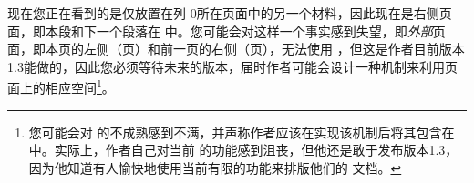 %
% 

现在您正在看到的是仅放置在列-0所在页面中的另一个材料，因此现在是右侧页面，即本段和下一个段落在 \postenv 中。您可能会对这样一个事实感到失望，即\emph{外部}页面，即本页的左侧（\pageref{page:ppts-paired2}页）和前一页的右侧（\pageref{sec:ppts-paired}页），无法使用 \pwstuff{}，但这是作者目前版本1.3能做的，因此您必须等待未来的版本，届时作者可能会设计一种机制来利用页面上的相应空间\footnote{%
您可能会对 \parapag{} 的不成熟感到不满，并声称作者应该在实现该机制后将其包含在 \Paracol{} 中。实际上，作者自己对当前 \parapag{} 的功能感到沮丧，但他还是敢于发布版本1.3，因为他知道有人愉快地使用当前有限的功能来排版他们的 \parapag{} 文档。}。

